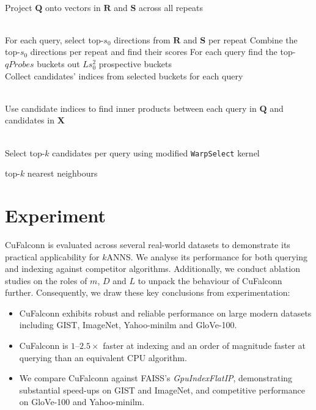\documentclass{article}
\newcommand{\bX}{\mathbf{X}}
\newcommand{\bQ}{\mathbf{Q}}
\newcommand{\bR}{\mathbf{R}}
\newcommand{\bS}{\mathbf{S}}
\newcommand{\ws}{\texttt{WarpSelect}\xspace}
\newcommand{\qp}{qProbes\xspace}
\newcommand{\sz}{s_0}
\newcommand{\cf}{CuFalconn\xspace}
\newcommand{\glv}{GloVe-100\xspace}
\newcommand{\imgnt}{ImageNet\xspace}
\newcommand{\gist}{GIST\xspace}
\newcommand{\ymlm}{Yahoo-minilm\xspace}
\begin{document}
\begin{algorithm}
	\caption{\cf Querying}
	\label{alg:cfQuerying} 									
	\begin{algorithmic}[1]
		\Procedure{Querying}{$\bX, \bQ, \bR, \bS, L, \qp, \sz, k$}

            \\ 
            \State Project $\bQ$ onto vectors in $\bR$ and $\bS$ across all repeats

            \\ 
            \State For each query, select top-$\sz$ directions from $\bR$ and $\bS$ per repeat
            \State Combine the top-$\sz$ directions per repeat and find their scores
            \State For each query find the top-$\qp$ buckets out $L \sz^2$ prospective buckets
            \\ 
            \State Collect candidates' indices from selected buckets for each query

            \\
            \State Use candidate indices to find inner products between each query in $\bQ$ and candidates in $\bX$

            \\
            \State Select top-$k$ candidates per query using modified \ws kernel

            \State \Return top-$k$ nearest neighbours

		\EndProcedure
	\end{algorithmic}
\end{algorithm}

\section{Experiment}
\label{sec:experiment}

\cf is evaluated across several real-world datasets to demonstrate its practical applicability for $k$ANNS. We analyse its performance for both querying and indexing against competitor algorithms. Additionally, we conduct ablation studies on the roles of $m$, $D$ and $L$ to unpack the behaviour of \cf further. Consequently, we draw these key conclusions from experimentation:

\begin{itemize}
    \item \cf exhibits robust and reliable performance on large modern datasets including \gist, \imgnt, \ymlm and \glv.
    \item \cf is $1\text{--}2.5\times$ faster at indexing and an order of magnitude faster at querying than an equivalent CPU algorithm.
    \item We compare \cf against FAISS's \textit{GpuIndexFlatIP}, demonstrating substantial speed-ups on \gist and \imgnt, and competitive performance on \glv and \ymlm.
\end{itemize}
\end{document}

